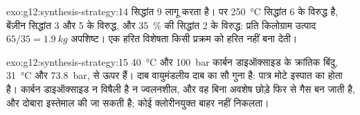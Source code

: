 \begin{solution}{exo:g12:synthesis-strategy:14}
 सिद्धांत 9 लागू करता है। पर \qty{250}{\celsius} सिद्धांत 6
के विरुद्ध है, बेंज़ीन सिद्धांत 3 और 5 के विरुद्ध, और
\qty{35}{\percent} की  सिद्धांत 2 के विरुद्ध: प्रति किलोग्राम उत्पाद
$65/35 = \qty{1.9}{kg}$ अपशिष्ट। एक हरित विशेषता किसी प्रक्रम को हरित
नहीं बना देती।
\end{solution}

\begin{solution}{exo:g12:synthesis-strategy:15}
\qty{40}{\celsius} और \qty{100}{bar} कार्बन डाइऑक्साइड के क्रांतिक बिंदु,
\qty{31}{\celsius} और \qty{73.8}{bar}, से ऊपर हैं। दाब
वायुमंडलीय दाब का सौ गुना है: पात्र मोटे इस्पात का होता है। कार्बन
डाइऑक्साइड न विषैली है न ज्वलनशील, और वह बिना अवशेष छोड़े
फिर से गैस बन जाती है, और दोबारा इस्तेमाल की जा सकती है; कोई क्लोरीनयुक्त  बाहर नहीं निकलता।
\end{solution}

